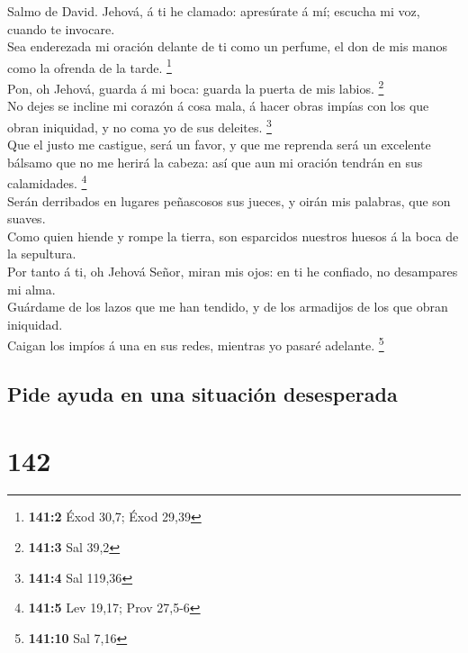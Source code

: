  Salmo de David. Jehová, á ti he clamado: apresúrate á mí;
escucha mi voz, cuando te invocare.\\
 Sea enderezada mi oración delante de ti como un perfume,
el don de mis manos como la ofrenda de la tarde. \footnote{\textbf{141:2}
  Éxod 30,7; Éxod 29,39}\\
 Pon, oh Jehová, guarda á mi boca: guarda la puerta de mis
labios. \footnote{\textbf{141:3} Sal 39,2}\\
 No dejes se incline mi corazón á cosa mala, á hacer obras
impías con los que obran iniquidad, y no coma yo de sus deleites.
\footnote{\textbf{141:4} Sal 119,36}\\
 Que el justo me castigue, será un favor, y que me
reprenda será un excelente bálsamo que no me herirá la cabeza: así que
aun mi oración tendrán en sus calamidades. \footnote{\textbf{141:5} Lev
  19,17; Prov 27,5-6}\\
 Serán derribados en lugares peñascosos sus jueces, y
oirán mis palabras, que son suaves.\\
 Como quien hiende y rompe la tierra, son esparcidos
nuestros huesos á la boca de la sepultura.\\
 Por tanto á ti, oh Jehová Señor, miran mis ojos: en ti he
confiado, no desampares mi alma.\\
 Guárdame de los lazos que me han tendido, y de los
armadijos de los que obran iniquidad.\\
 Caigan los impíos á una en sus redes, mientras yo pasaré
adelante. \footnote{\textbf{141:10} Sal 7,16}

\hypertarget{pide-ayuda-en-una-situaciuxf3n-desesperada}{%
\subsection{Pide ayuda en una situación
desesperada}\label{pide-ayuda-en-una-situaciuxf3n-desesperada}}

\hypertarget{section-141}{%
\section{142}\label{section-141}}

